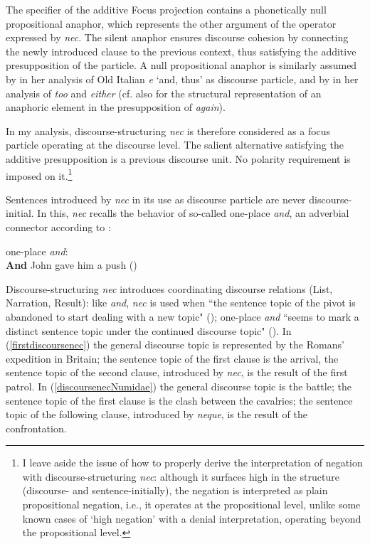 \documentclass[output=paper,modfonts,nonflat,citecolor=brown,
showindex
]{langsci/langscibook}
\begin{document}
The specifier of the additive Focus projection contains a phonetically null \linebreak propositional anaphor, which represents the other argument of the operator expressed by {\emph{nec}}. The silent anaphor ensures discourse cohesion by connecting the newly introduced clause to the previous context, thus satisfying the additive presupposition of the particle. A null propositional anaphor is similarly assumed by \citet[22-27]{Poletto14} in her analysis of Old Italian {\emph{e}} `and, thus' as discourse particle, and by \citet{Ahn15} in her analysis of {\emph{too}} and {\emph{either}} (cf. also \citealt[]{Beck06} for the structural representation of an anaphoric element in the presupposition of {\emph{again}}). 

In my analysis, discourse-structuring {\emph{nec}} is therefore considered as a focus particle operating at the discourse level. The salient alternative satisfying the additive presupposition is a previous discourse unit. No polarity requirement is imposed on it.{\footnote{I leave aside the issue of how to properly derive the interpretation of negation with discourse-structuring {\emph{nec}}: although it surfaces high in the structure (discourse- and sentence-initially), the negation is interpreted as plain propositional negation, i.e., it operates at the propositional level, unlike some known cases of `high negation' with a denial interpretation, operating beyond the propositional level.}} 
 
Sentences introduced by {\emph{nec}} in its use as discourse particle are never discourse-initial. In this, {\emph{nec}} recalls the behavior of so-called one-place {\emph{and}}, an adverbial connector according to \citet[]{ZeevatJasinskaja07}: 
 
{\begin{exe}
\ex one-place {\emph{and}}:\\
{\textbf{And}} John gave him a push (\citealt[their ex. 7]{ZeevatJasinskaja07})
\end{exe}}
 
 \noindent Discourse-structuring {\emph{nec}} introduces coordinating discourse relations (List, Narration, Result): like {\emph{and}}, {\emph{nec}} is used when ``the sentence topic of the pivot is abandoned to start dealing with a new topic" (\citealt[325]{ZeevatJasinskaja07}); one-place {\emph{and}} ``seems to mark a distinct sentence topic under the continued discourse topic" (\citealt[325]{ZeevatJasinskaja07}). In (\ref{firstdiscoursenec}) the general discourse topic is represented by the Romans' expedition in Britain; the sentence topic of the first clause is the arrival, the sentence topic of the second clause, introduced by {\emph{nec}}, is the result of the first patrol. In (\ref{discoursenecNumidae}) the general discourse topic is the battle; the sentence topic of the first clause is the clash between the cavalries; the sentence topic of the following clause, introduced by {\emph{neque}}, is the result of the confrontation. 
 
\end{document}
